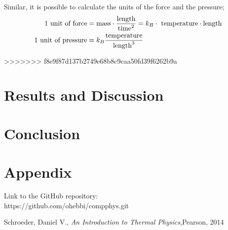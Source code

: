 \documentclass{article}
\begin{document}
Similar, it is possible to calculate the units of the force and the pressure;
\begin{align}
	\textnormal{1 unit of force} &= \textnormal{mass}\cdot\frac{\textnormal{length}}{\textnormal{time}^2} = k_B \cdot \textnormal{ temperature}\cdot\textnormal{length}\\
	\textnormal{1 unit of pressure} &=k_B \frac{\textnormal{temperature}}{\textnormal{length}^3}
\end{align}

>>>>>>> f8e9f87d137b2749e68b8c9caa50fd39f6262b9a
\section{Results and Discussion}





\section{Conclusion}


\section{Appendix}
Link to the GitHub repository:\\

https://github.com/ohebbi/compphys.git

\begin{thebibliography}{}
Schroeder, Daniel V., \textit{An Introduction to Thermal Physics},Pearson, 2014\\
\end{thebibliography}
\end{document}
